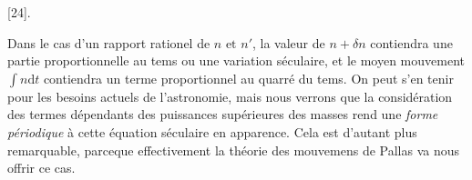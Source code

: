 \par{}\bigskip
{}
\begin{center}[24].\end{center}
\begingroup
\makeatletter
\def\@makefnmark{\hbox{\normalfont\@thefnmark}}
\makeatother
\noindent\hspace*{\parindent}Dans le cas d’un rapport rationel de \(n\text{ et }n'\), la valeur de \(n+\delta n\) contiendra une partie proportionnelle au tems ou une variation séculaire, et le moyen mouvement \(\int n\mathrm{d}t\) contiendra un terme proportionnel au quarré du tems. On peut s’en tenir pour les besoins actuels de l’astronomie, mais nous verrons que la considération des termes dépendants des puissances supérieures des masses rend une \textit{forme périodique} à cette équation séculaire en apparence. Cela est d’autant plus remarquable, parceque effectivement la théorie des mouvemens de Pallas va nous offrir ce cas\HistoricalNoteEight{Voir p. 557---559.] }.
\par\endgroup

